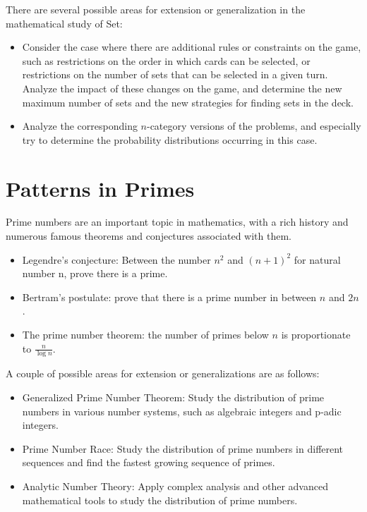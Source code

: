 \documentclass{article}
\begin{document}
    \vspace{3mm}
    \noindent There are several possible areas for extension or generalization in the mathematical study of Set:
    \begin{itemize}
        \item Consider the case where there are additional rules or constraints on the game, such as restrictions on the order in which cards can be selected, or restrictions on the number of sets that can be selected in a given turn. Analyze the impact of these changes on the game, and determine the new maximum number of sets and the new strategies for finding sets in the deck.
        \item Analyze the corresponding $n$-category versions of the problems, and especially try to determine the probability distributions occurring in this case.
    \end{itemize}

\pagebreak

\section{Patterns in Primes}
    Prime numbers are an important topic in mathematics, with a rich history and numerous famous theorems and conjectures associated with them.
    \begin{itemize}
        \item Legendre's conjecture: Between the number $n^2$ and $(n + 1)^2$ for natural number n, prove there is a prime.
        \item Bertram's postulate: prove that there is a prime number in between $n$ and $2n$.
        \item The prime number theorem: the number of primes below $n$ is proportionate to $\frac{n}{\log n}$.
    \end{itemize}

    \vspace{3mm}
    A couple of possible areas for extension or generalizations are as follows:
    \begin{itemize}
        \item Generalized Prime Number Theorem: Study the distribution of prime numbers in various number systems, such as algebraic integers and p-adic integers.
    
        \item Prime Number Race: Study the distribution of prime numbers in different sequences and find the fastest growing sequence of primes.
        
        \item Analytic Number Theory: Apply complex analysis and other advanced mathematical tools to study the distribution of prime numbers.
    \end{itemize}
    
\end{document}
